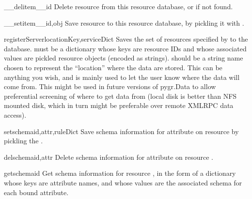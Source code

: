 \documentclass{howto}
\begin{document}
\begin{funcdesc}{__delitem__}{id}
  Delete resource  from this resource database, or  
  if not found.
\end{funcdesc}

\begin{funcdesc}{__setitem__}{id,obj}
  Save resource  to this resource database, by pickling it
  with .
\end{funcdesc}

\begin{funcdesc}{registerServer}{locationKey,serviceDict}
  Saves the set of resources specified by  to the
  database.
   must be a dictionary whose keys are resource IDs and
  whose associated values are pickled resource objects (encoded as strings).
   should be a string name chosen to represent the ``location''
  where the data are stored.  This can be anything you wish, and is mainly used
  to let the user know where the data will come from.  This might be used
  in future versions of pygr.Data to allow preferential screening of where
  to get data from (local disk is better than NFS mounted disk, which in turn
  might be preferable over remote XMLRPC data access).
\end{funcdesc}

\begin{funcdesc}{setschema}{id,attr,ruleDict}
  Save schema information for attribute  on resource 
  by pickling the .
\end{funcdesc}

\begin{funcdesc}{delschema}{id,attr}
  Delete schema information for attribute  on resource .
\end{funcdesc}

\begin{funcdesc}{getschema}{id}
  Get schema information for resource , in the form of a dictionary
  whose keys are attribute names, and whose values are the associated
  schema  for each bound attribute.
\end{funcdesc}
\end{document}
